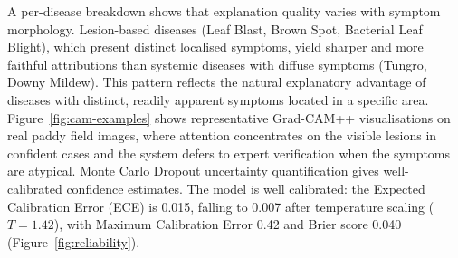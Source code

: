 \documentclass[pdflatex,sn-mathphys-num]{sn-jnl}%
\begin{document}
A per-disease breakdown shows that explanation quality varies with symptom morphology. Lesion-based diseases (Leaf Blast, Brown Spot, Bacterial Leaf Blight), which present distinct localised symptoms, yield sharper and more faithful attributions than systemic diseases with diffuse symptoms (Tungro, Downy Mildew). This pattern reflects the natural explanatory advantage of diseases with distinct, readily apparent symptoms located in a specific area. Figure~\ref{fig:cam-examples} shows representative Grad-CAM++ visualisations on real paddy field images, where attention concentrates on the visible lesions in confident cases and the system defers to expert verification when the symptoms are atypical. Monte Carlo Dropout uncertainty quantification gives well-calibrated confidence estimates. The model is well calibrated: the Expected Calibration Error (ECE) is 0.015, falling to 0.007 after temperature scaling ($T=1.42$), with Maximum Calibration Error 0.42 and Brier score 0.040 (Figure~\ref{fig:reliability}).
\end{document}
